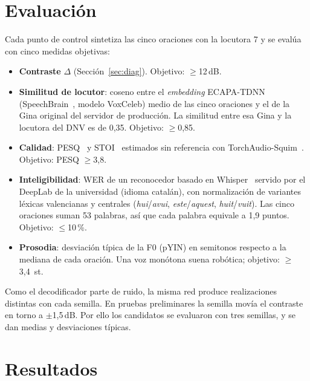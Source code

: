 \documentclass[conference]{IEEEtran}
\newcommand{\dB}{\,dB}
\begin{document}
\section{Evaluación}\label{sec:eval}

Cada punto de control sintetiza las cinco oraciones con la locutora 7 y se evalúa con cinco medidas objetivas:
\begin{itemize}
\item \textbf{Contraste} $\Delta$ (Sección~\ref{sec:diag}). Objetivo: $\ge$12\dB.
\item \textbf{Similitud de locutor}: coseno entre el \textit{embedding} ECAPA-TDNN~\cite{desplanques2020ecapa} (SpeechBrain~\cite{ravanelli2021speechbrain}, modelo VoxCeleb) medio de las cinco oraciones y el de la Gina original del servidor de producción. La similitud entre esa Gina y la locutora del DNV es de 0,35. Objetivo: $\ge$0,85.
\item \textbf{Calidad}: PESQ~\cite{rix2001pesq} y STOI~\cite{taal2011stoi} estimados sin referencia con TorchAudio-Squim~\cite{kumar2023squim}. Objetivo: PESQ $\ge$3,8.
\item \textbf{Inteligibilidad}: WER de un reconocedor basado en Whisper~\cite{radford2023whisper} servido por el DeepLab de la universidad (idioma catalán), con normalización de variantes léxicas valencianas y centrales (\textit{hui}/\textit{avui}, \textit{este}/\textit{aquest}, \textit{huit}/\textit{vuit}). Las cinco oraciones suman 53 palabras, así que cada palabra equivale a 1,9 puntos. Objetivo: $\le$10\,\%.
\item \textbf{Prosodia}: desviación típica de la F0 (pYIN) en semitonos respecto a la mediana de cada oración. Una voz monótona suena robótica; objetivo: $\ge$3,4~st.
\end{itemize}

Como el decodificador parte de ruido, la misma red produce realizaciones distintas con cada semilla. En pruebas preliminares la semilla movía el contraste en torno a $\pm$1,5\dB. Por ello los candidatos se evaluaron con tres semillas, y se dan medias y desviaciones típicas.

\section{Resultados}
\end{document}
